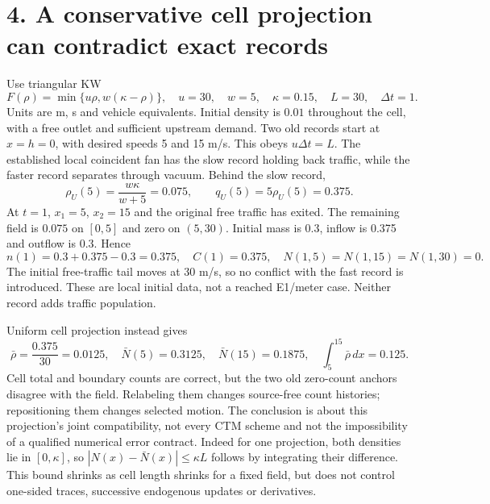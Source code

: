 \documentclass[11pt,a4paper]{article}
\begin{document}
\section*{4. A conservative cell projection can contradict exact records}
Use triangular KW
\begin{equation}
 F(\rho)=\min\{u\rho,w(\kappa-\rho)\},\quad
 u=30,\quad w=5,\quad\kappa=0.15,\quad L=30,\quad\Delta t=1.
\end{equation}
Units are m, s and vehicle equivalents. Initial density is $0.01$ throughout
the cell, with a free outlet and sufficient upstream demand. Two old records
start at $x=h=0$, with desired speeds 5 and 15 m/s. This obeys $u\Delta t=L$.
The established local coincident fan has the slow record holding back traffic,
while the faster record separates through vacuum. Behind the slow record,
\begin{equation}
 \rho_U(5)=\frac{w\kappa}{w+5}=0.075,\qquad q_U(5)=5\rho_U(5)=0.375.
\end{equation}
At $t=1$, $x_1=5$, $x_2=15$ and the original free traffic has exited. The
remaining field is $0.075$ on $[0,5]$ and zero on $(5,30)$. Initial mass is
0.3, inflow is 0.375 and outflow is 0.3. Hence
\begin{equation}
 n(1)=0.3+0.375-0.3=0.375,\quad C(1)=0.375,\quad
 N(1,5)=N(1,15)=N(1,30)=0.
\end{equation}
The initial free-traffic tail moves at 30 m/s, so no conflict with the fast
record is introduced. These are local initial data, not a reached E1/meter
case. Neither record adds traffic population.

\newpage
Uniform cell projection instead gives
\begin{equation}
 \bar\rho=\frac{0.375}{30}=0.0125,\quad
 \bar N(5)=0.3125,\quad\bar N(15)=0.1875,\quad
 \int_5^{15}\bar\rho\,dx=0.125.
\end{equation}
Cell total and boundary counts are correct, but the two old zero-count
anchors disagree with the field. Relabeling them changes source-free count
histories; repositioning them changes selected motion. The conclusion is
about this projection's joint compatibility, not every CTM scheme and not
the impossibility of a qualified numerical error contract.
Indeed for one projection, both densities lie in $[0,\kappa]$, so
$|N(x)-\bar N(x)|\le\kappa L$ follows by integrating their difference.
This bound shrinks as cell length shrinks for a fixed field, but does not
control one-sided traces, successive endogenous updates or derivatives.
\end{document}
